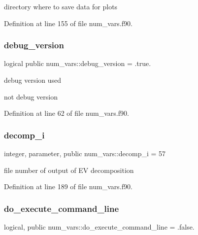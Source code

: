 directory where to save data for plots 



Definition at line 155 of file num\+\_\+vars.\+f90.

\mbox{\label{namespacenum__vars_a60589d0e73cbffd69d115c1f709745a2}} 
\subsubsection{\texorpdfstring{debug\+\_\+version}{debug\_version}}
{\footnotesize\ttfamily logical public num\+\_\+vars\+::debug\+\_\+version = .true.}



debug version used 

not debug version 

Definition at line 62 of file num\+\_\+vars.\+f90.

\mbox{\label{namespacenum__vars_a886394fc855acaa9a5e4ab5b3ce8c9d9}} 
\subsubsection{\texorpdfstring{decomp\+\_\+i}{decomp\_i}}
{\footnotesize\ttfamily integer, parameter, public num\+\_\+vars\+::decomp\+\_\+i = 57}



file number of output of EV decomposition 



Definition at line 189 of file num\+\_\+vars.\+f90.

\mbox{\label{namespacenum__vars_ad5ba241cde0a99cdd5b3d6a6c0340e5c}} 
\subsubsection{\texorpdfstring{do\+\_\+execute\+\_\+command\+\_\+line}{do\_execute\_command\_line}}
{\footnotesize\ttfamily logical, public num\+\_\+vars\+::do\+\_\+execute\+\_\+command\+\_\+line = .false.}



